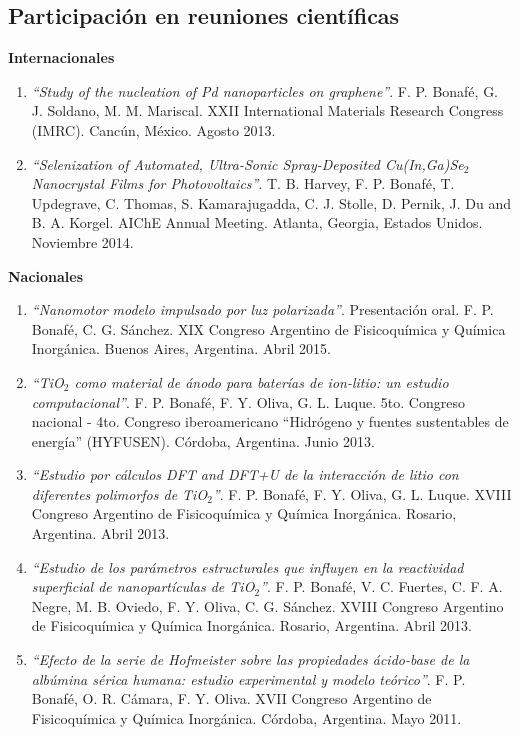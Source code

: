 \documentclass[10pt]{article}
\begin{document}
\subsection{Participación en reuniones científicas}
{\bf Internacionales}
\begin{enumerate}
 \item{\it ``Study of the nucleation of Pd nanoparticles on graphene''}. F. P. Bonafé, G. J. Soldano, M. M. Mariscal.
 XXII International Materials Research Congress (IMRC). Cancún, México. Agosto 2013.
 \item{\it ``Selenization of Automated, Ultra-Sonic Spray-Deposited Cu(In,Ga)Se$_2$ Nanocrystal Films for Photovoltaics''}. T. B. Harvey, F. P. Bonafé, T. Updegrave, C. Thomas, S. Kamarajugadda, C. J. Stolle, D. Pernik, J. Du and B. A. Korgel. AIChE Annual Meeting. Atlanta, Georgia, Estados Unidos. Noviembre 2014.
\end{enumerate}
{\bf Nacionales}
\begin{enumerate}
 \item{\it ``Nanomotor modelo impulsado por luz polarizada''}. Presentación oral. F. P. Bonafé, C. G. Sánchez.
 XIX Congreso Argentino de Fisicoquímica y Química Inorgánica. Buenos Aires, Argentina. Abril 2015.
 \item{\it ``TiO$_2$ como material de ánodo para baterías de ion-litio: un estudio computacional''}. F. P. Bonafé, F. Y. Oliva, G. L. Luque.
 5to. Congreso nacional - 4to. Congreso iberoamericano ``Hidrógeno y fuentes sustentables de energía'' (HYFUSEN). Córdoba, Argentina. Junio 2013.
 \item {\it ``Estudio por cálculos DFT and DFT+U de la interacción de litio con diferentes polimorfos de TiO$_2$''}. F. P. Bonafé, F. Y. Oliva, G. L. Luque. 
 XVIII Congreso Argentino de Fisicoquímica y Química Inorgánica. Rosario, Argentina. Abril 2013.
 \item {\it ``Estudio de los parámetros estructurales que influyen en la reactividad superficial de nanopartículas de TiO$_2$''}. F. P. Bonafé, V. C. Fuertes, C. F. A. Negre, M. B. Oviedo, F. Y. Oliva, C. G. Sánchez.
 XVIII Congreso Argentino de Fisicoquímica y Química Inorgánica. Rosario, Argentina. Abril 2013.
 \item {\it ``Efecto de la serie de Hofmeister sobre las propiedades ácido-base de la albúmina sérica humana: estudio experimental y modelo teórico''}. F. P. Bonafé, O. R. Cámara, F. Y. Oliva.
 XVII Congreso Argentino de Fisicoquímica y Química Inorgánica. Córdoba, Argentina. Mayo 2011.
\end{enumerate}
\end{document}
